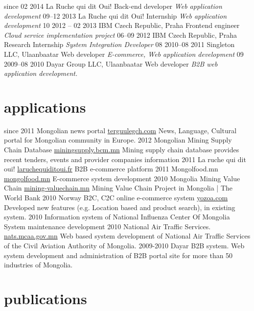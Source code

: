 \documentclass[]{friggeri-cv}
\begin{document}
\begin{entrylist}
  \entry
    {since 02 2014}
    {La Ruche qui dit Oui!}
    {Back-end developer}
    {\emph{Web application development}}
  \entry
    {09–12 2013}
    {La Ruche qui dit Oui!}
    {Internship}
    {\emph{Web application development}}
  \entry
    {10 2012 – 02 2013}
    {IBM Czech Republic, Praha}
    {Frontend engineer}
    {\emph{Cloud service implementation project}}
  \entry
    {06–09 2012}
    {IBM Czech Republic, Praha}
    {Research Internship}
    {\emph{System Integration Developer}}
  \entry
    {08 2010–08 2011}
    {Singleton LLC, Ulaanbaatar}
    {Web developer}
    {\emph{E-commerce, Web application development}}
  \entry
    {09 2009–08 2010}
    {Dayar Group LLC, Ulaanbaatar}
    {Web developer}
    {\emph{B2B web application development.}}
\end{entrylist}

\section{applications}

\begin{entrylist}
  \entry
    {since 2011}
    {Mongolian news portal}
    {\href{http://terguulegch.com}{terguulegch.com}}
    {News, Language, Cultural portal for Mongolian community in Europe.}
  \entry
    {2012}
    {Mongolian Mining Supply Chain Database}
    {\href{http://miningsupply.bcm.mn}{miningsupply.bcm.mn}}
    {Mining supply chain database provides recent tenders, events and provider companies information }
  \entry
    {2011}
    {La ruche qui dit oui!}
    {\href{http://www.laruchequiditoui.fr}{laruchequiditoui.fr}}
    {B2B e-commerce platform}
  \entry
    {2011}
    {Mongolfood.mn}
    {\href{http://mongolfood.mn/}{mongolfood.mn}}
    {E-commerce system development}
  \entry
    {2010}
    {Mongolia Mining Value Chain}
    {\href{http://mining-valuechain.eri.mn}{mining-valuechain.mn}}
    {Mining Value Chain Project in Mongolia | The World Bank}
  \entry
    {2010}
    {Norway B2C, C2C online e-commerce system}
    {\href{http://dev.yozoa.com}{yozoa.com}}
    {Developed new features (e.g. Location based and product search),  in existing system.}
  \entry
    {2010}
    {Information system of National Influenza Center Of Mongolia}
    {}
    {System maintenance development}
  \entry
    {2010}
    {National Air Traffic Services.}
    {\href{http://nats.mcaa.gov.mn/}{nats.mcaa.gov.mn}}
    {Web based system development of National Air Traffic Services of the Civil Aviation Authority of Mongolia.}
  \entry
    {2009-2010}
    {Dayar B2B system.}
    {}
    {Web system development and administration of B2B portal site for more than 50 industries of Mongolia.}
\end{entrylist}

\section{publications}

\end{document}
